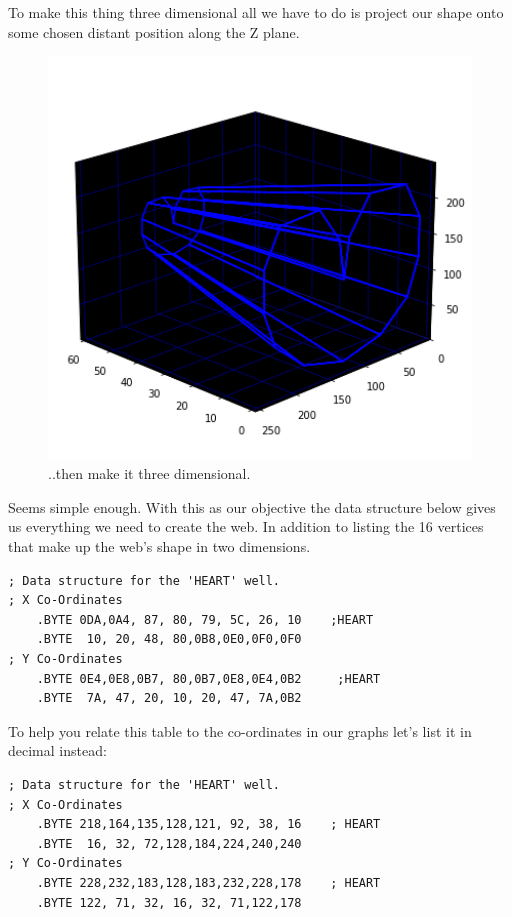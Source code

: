To make this thing three dimensional all we have to do is project our shape onto
some chosen distant position along the Z plane.
\vspace{-0.5cm}
\begin{figure}[H]
    \centering
    \begin{adjustbox}{width=8cm,center}
      \includegraphics[width=12cm]{src/wells/HEART_3d.png}%
    \end{adjustbox}
  \caption{..then make it three dimensional.}
\end{figure}

Seems simple enough. With this as our objective the data structure below gives us
everything we need to create the web. In addition to listing the 16 vertices that
make up the web's shape in two dimensions.

\begin{lstlisting}
; Data structure for the 'HEART' well. 
; X Co-Ordinates
    .BYTE 0DA,0A4, 87, 80, 79, 5C, 26, 10    ;HEART
    .BYTE  10, 20, 48, 80,0B8,0E0,0F0,0F0
; Y Co-Ordinates
    .BYTE 0E4,0E8,0B7, 80,0B7,0E8,0E4,0B2     ;HEART
    .BYTE  7A, 47, 20, 10, 20, 47, 7A,0B2
\end{lstlisting}

To help you relate this table to the co-ordinates in our graphs let's list
it in decimal instead:
\begin{lstlisting}
; Data structure for the 'HEART' well. 
; X Co-Ordinates
    .BYTE 218,164,135,128,121, 92, 38, 16    ; HEART
    .BYTE  16, 32, 72,128,184,224,240,240
; Y Co-Ordinates
    .BYTE 228,232,183,128,183,232,228,178    ; HEART
    .BYTE 122, 71, 32, 16, 32, 71,122,178
\end{lstlisting}

